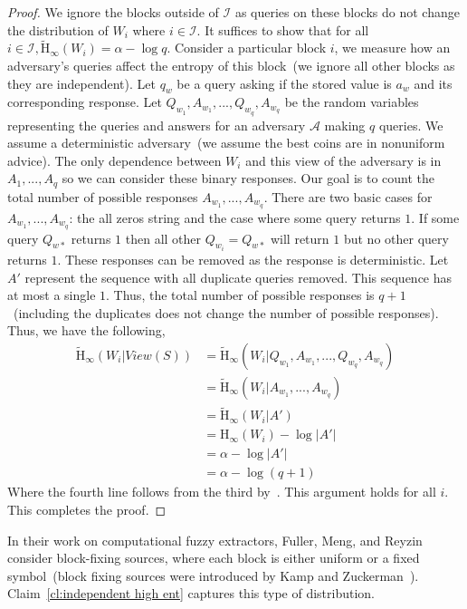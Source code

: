 \documentclass[11pt]{article}
\newcommand{\clref}[1]{\mbox{Claim~\ref{#1}}}
\newcommand{\Hoo}{\mathrm{H}_\infty}
\newcommand{\Hav}{\tilde{\mathrm{H}}_\infty}
\begin{document}
\begin{proof}
We ignore the blocks outside of $\mathcal{I}$ as queries on these blocks do not change the distribution of $W_i$ where $i\in \mathcal{I}$.  It suffices to show that for all $i\in \mathcal{I}, \Hav(W_i) = \alpha -\log q$.
Consider a particular block $i$, we measure how an adversary's queries affect the entropy of this block~(we ignore all other blocks as they are independent).
Let $q_w$ be a query asking if the stored value is $a_w$ and its corresponding response.
Let $Q_{w_1},A_{w_1},..., Q_{w_q}, A_{w_q}$ be the random variables representing the queries and answers for an  adversary $\mathcal{A}$ making $q$ queries.  We assume a deterministic adversary~(we assume the best coins are in nonuniform advice).  The only dependence between $W_i$ and this view of the adversary is in $A_1,..., A_q$ so we can consider these binary responses.  Our goal is to count the total number of possible responses $A_{w_1},..., A_{w_q}$.  There are two basic cases for $A_{w_1},..., A_{w_q}$: the all zeros string and the case where some query returns $1$.  If some query $Q_{w*}$ returns $1$ then all other $Q_{w_i} = Q_{w*}$ will return $1$ but no other query returns $1$.  These responses can be removed as the response is deterministic.  Let $A'$ represent the sequence with all duplicate queries removed.  This sequence has at most a single $1$.  Thus, the total number of possible responses is $q+1$~(including the duplicates does not change the number of possible responses).  Thus, we have the following,
\begin{align*}
\Hav(W_i | View(S)) &= \Hav(W_i| Q_{w_1}, A_{w_1},..., Q_{w_q}, A_{w_q})\\
&=\Hav(W_i | A_{w_1},..., A_{w_q})\\
&=\Hav(W_i |A') \\
&=\Hoo(W_i) - \log |A'|\\
&=\alpha - \log |A'|\\
&=\alpha - \log (q+1)
\end{align*}
Where the fourth line follows from the third by~\cite[Lemma 2.2]{DBLP:journals/siamcomp/DodisORS08}.
This argument holds for all $i$.  This completes the proof.
\end{proof}
\noindent In their work on computational fuzzy extractors, Fuller, Meng, and Reyzin~\cite{fuller2013computational} consider block-fixing sources, where each block is either uniform or a fixed symbol~(block fixing sources were introduced by Kamp and Zuckerman~\cite{KZ07}).  \clref{cl:independent high ent} captures this type of distribution.
\end{document}
